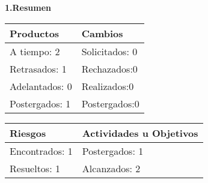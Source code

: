 \documentclass[12pt]{report}
\numberwithin{equation}{section}
\begin{document}
\begin{flushleft}

\textbf{1.Resumen}\\

\begin{table}[H]
\centering
\begin{tabular}{|m{5cm}|m{5cm}|}
\hline
\textbf{Productos} & \textbf{Cambios}\\
\hline \hline
\small{A tiempo: 2 }&\small{ Solicitados: 0}\\
\hline
\small{Retrasados: 1}& \small{Rechazados:0}\\
\hline
\small{Adelantados: 0}& \small{Realizados:0}\\
\hline
\small{Postergados: 1}& \small{Postergados:0}\\
\hline
\end{tabular}
\end{table}

\begin{table}[H]
\centering
\begin{tabular}{|m{5cm}|m{5cm}|}
\hline
\textbf{Riesgos} & \textbf{Actividades u Objetivos}\\
\hline \hline
\small{Encontrados: 1}& \small{Postergados: 1}\\
\hline
\small{Resueltos: 1} & \small{Alcanzados: 2}\\
\hline
\end{tabular}
\label{tabla: TABLA CE ResumenCierre}
\end{table}

\end{flushleft}
\end{document}

